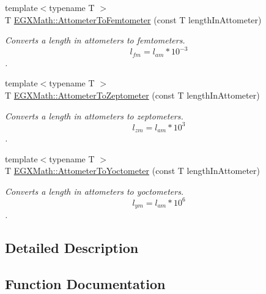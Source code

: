 \begin{DoxyCompactItemize}
{\footnotesize template$<$typename T $>$ }\\T \mbox{\hyperlink{group___e_g_x_math-_conversions-_length_conversions-_s_i-_attometer-_s_i_gafbaa622bc31794c382e244942fa1d445}{E\+G\+X\+Math\+::\+Attometer\+To\+Femtometer}} (const T length\+In\+Attometer)
\begin{DoxyCompactList}\small\item\em Converts a length in attometers to femtometers. \[ l_{fm}=l_{am} * 10^{-3} \]. \end{DoxyCompactList}\item 
{\footnotesize template$<$typename T $>$ }\\T \mbox{\hyperlink{group___e_g_x_math-_conversions-_length_conversions-_s_i-_attometer-_s_i_ga88493321ed49951744e5afe2b0bf7e5c}{E\+G\+X\+Math\+::\+Attometer\+To\+Zeptometer}} (const T length\+In\+Attometer)
\begin{DoxyCompactList}\small\item\em Converts a length in attometers to zeptometers. \[ l_{zm}=l_{am} * 10^{3} \]. \end{DoxyCompactList}\item 
{\footnotesize template$<$typename T $>$ }\\T \mbox{\hyperlink{group___e_g_x_math-_conversions-_length_conversions-_s_i-_attometer-_s_i_gaf325d426b8544c973b0f140b0d4e0f06}{E\+G\+X\+Math\+::\+Attometer\+To\+Yoctometer}} (const T length\+In\+Attometer)
\begin{DoxyCompactList}\small\item\em Converts a length in attometers to yoctometers. \[ l_{ym}=l_{am} * 10^{6} \]. \end{DoxyCompactList}\end{DoxyCompactItemize}


\subsection{Detailed Description}


\subsection{Function Documentation}
\mbox{\label{group___e_g_x_math-_conversions-_length_conversions-_s_i-_attometer-_s_i_gaff6439c15e3bb4a90595864e814960a7}} 
